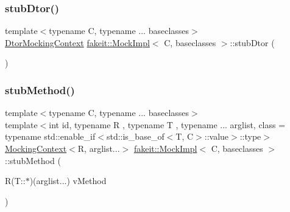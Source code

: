 \subsubsection{\texorpdfstring{stubDtor()}{stubDtor()}\hspace{0.1cm}{\footnotesize\ttfamily [9/9]}}
{\footnotesize\ttfamily template$<$typename C, typename ... baseclasses$>$ \\
\mbox{\hyperlink{classfakeit_1_1DtorMockingContext}{Dtor\+Mocking\+Context}} \mbox{\hyperlink{classfakeit_1_1MockImpl}{fakeit\+::\+Mock\+Impl}}$<$ C, baseclasses $>$\+::stub\+Dtor (\begin{DoxyParamCaption}{ }\end{DoxyParamCaption})\hspace{0.3cm}{\ttfamily [inline]}}

\mbox{\label{classfakeit_1_1MockImpl_a603befd40e35ea88c7efee965f15bb60}} 
\subsubsection{\texorpdfstring{stubMethod()}{stubMethod()}\hspace{0.1cm}{\footnotesize\ttfamily [1/9]}}
{\footnotesize\ttfamily template$<$typename C, typename ... baseclasses$>$ \\
template$<$int id, typename R , typename T , typename ... arglist, class  = typename std\+::enable\+\_\+if$<$std\+::is\+\_\+base\+\_\+of$<$\+T, C$>$\+::value$>$\+::type$>$ \\
\mbox{\hyperlink{classfakeit_1_1MockingContext}{Mocking\+Context}}$<$R, arglist...$>$ \mbox{\hyperlink{classfakeit_1_1MockImpl}{fakeit\+::\+Mock\+Impl}}$<$ C, baseclasses $>$\+::stub\+Method (\begin{DoxyParamCaption}\item[{R(T\+::$\ast$)(arglist...)}]{v\+Method }\end{DoxyParamCaption})\hspace{0.3cm}{\ttfamily [inline]}}

\mbox{\label{classfakeit_1_1MockImpl_a603befd40e35ea88c7efee965f15bb60}} 
